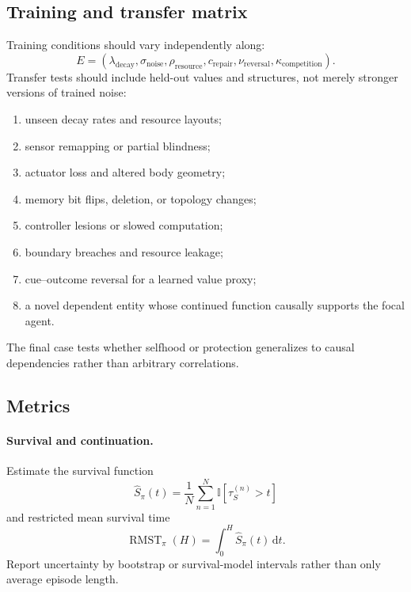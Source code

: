 \documentclass[11pt]{article}
\newcommand{\I}{\mathbb{I}}
\newcommand{\dd}{\mathrm{d}}
\newcommand{\RMST}{\operatorname{RMST}}
\begin{document}
\subsection{Training and transfer matrix}

Training conditions should vary independently along:
\begin{equation}
E=(\lambda_{\mathrm{decay}},\sigma_{\mathrm{noise}},
\rho_{\mathrm{resource}},c_{\mathrm{repair}},
\nu_{\mathrm{reversal}},\kappa_{\mathrm{competition}}).
\end{equation}
Transfer tests should include held-out values and structures, not merely stronger versions of trained noise:
\begin{enumerate}
\item unseen decay rates and resource layouts;
\item sensor remapping or partial blindness;
\item actuator loss and altered body geometry;
\item memory bit flips, deletion, or topology changes;
\item controller lesions or slowed computation;
\item boundary breaches and resource leakage;
\item cue--outcome reversal for a learned value proxy;
\item a novel dependent entity whose continued function causally supports the focal agent.
\end{enumerate}
The final case tests whether selfhood or protection generalizes to causal dependencies rather than arbitrary correlations.

\subsection{Metrics}

\paragraph{Survival and continuation.}
Estimate the survival function
\begin{equation}
\widehat S_\pi(t)
=
\frac{1}{N}\sum_{n=1}^{N}\I[\tau_S^{(n)}>t]
\end{equation}
and restricted mean survival time
\begin{equation}
\RMST_\pi(H)=\int_0^H \widehat S_\pi(t)\,\dd t.
\end{equation}
Report uncertainty by bootstrap or survival-model intervals rather than only average episode length.
\end{document}
